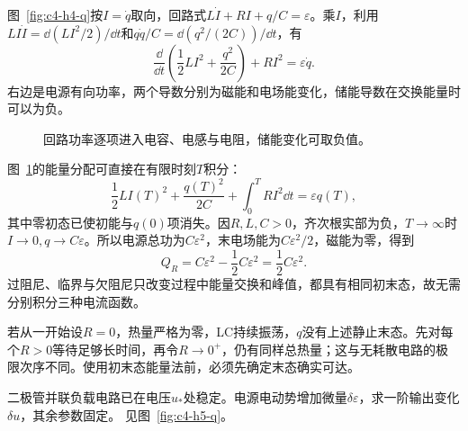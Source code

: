 \begin{solution}
图~\ref{fig:c4-h4-q}按$I=\dot q$取向，回路式$L\dot I+RI+q/C=\varepsilon$。乘$I$，利用$LI\dot I=\dd(LI^2/2)/\dd t$和$q\dot q/C=\dd(q^2/(2C))/\dd t$，有
\[
 \frac{\dd}{\dd t}\left(\frac12LI^2+\frac{q^2}{2C}\right)+RI^2
 =\varepsilon\dot q.
\]
右边是电源有向功率，两个导数分别为磁能和电场能变化，储能导数在交换能量时可以为负。
\begin{figure}[H]\centering
{}
\caption{回路功率逐项进入电容、电感与电阻，储能变化可取负值。}\label{fig:c4-h4-s}
\end{figure}
图~\ref{fig:c4-h4-s}的能量分配可直接在有限时刻$T$积分：
\[
 \frac12LI(T)^2+\frac{q(T)^2}{2C}
 +\int_0^T RI^2\dd t=\varepsilon q(T),
\]
其中零初态已使初能与$q(0)$项消失。因$R,L,C>0$，齐次根实部为负，$T\to\infty$时$I\to0,q\to C\varepsilon$。所以电源总功为$C\varepsilon^2$，末电场能为$C\varepsilon^2/2$，磁能为零，得到
\[
 \boxed{Q_R=C\varepsilon^2-\frac12C\varepsilon^2=\frac12C\varepsilon^2}.
\]
过阻尼、临界与欠阻尼只改变过程中能量交换和峰值，都具有相同初末态，故无需分别积分三种电流函数。

若从一开始设$R=0$，热量严格为零，LC持续振荡，$q$没有上述静止末态。先对每个$R>0$等待足够长时间，再令$R\to0^+$，仍有同样总热量；这与无耗散电路的极限次序不同。使用初末态能量法前，必须先确定末态确实可达。
\end{solution}

\begingroup
\setlength{\intextsep}{3pt}\setlength{\abovecaptionskip}{5pt}
\begin{exercise}[二极管工作点的小变化]\label{ex:c4-h5}
二极管并联负载电路已在电压$u_*$处稳定。电源电动势增加微量$\delta\varepsilon$，求一阶输出变化$\delta u$，其余参数固定。 见图~\ref{fig:c4-h5-q}。
\end{exercise}

